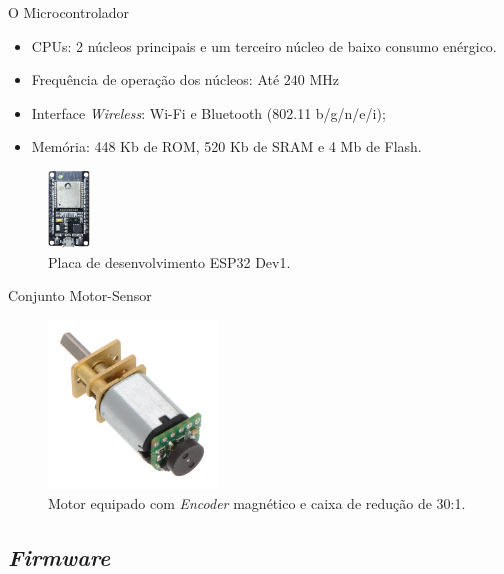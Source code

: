 \begin{frame}{O Microcontrolador}

\begin{itemize}
    \item CPUs: 2 núcleos principais e um terceiro núcleo de baixo consumo enérgico. 
    \item Frequência de operação dos núcleos: Até $240$ MHz
    \item Interface \emph{Wireless}: Wi-Fi e Bluetooth (802.11 b/g/n/e/i);
    \item Memória: 448 Kb de ROM, 520 Kb de SRAM e 4 Mb de Flash.
\end{itemize}

\begin{figure}[H]
    \centering
    \includegraphics[width=0.1\textwidth]{figuras/eletronica/esp32_kit.png}
    \caption{Placa de desenvolvimento ESP32 Dev1.}
\end{figure}

\end{frame}

\begin{frame}{Conjunto Motor-Sensor}
    \begin{figure}
        \centering
        \includegraphics[width=0.4\textwidth]{figuras/eletronica/motor_com_encoder.jpg}
        \caption{Motor equipado com \emph{Encoder} magnético e caixa de redução de 30:1.}
    \end{figure}
\end{frame}

\subsection{\emph{Firmware}}






